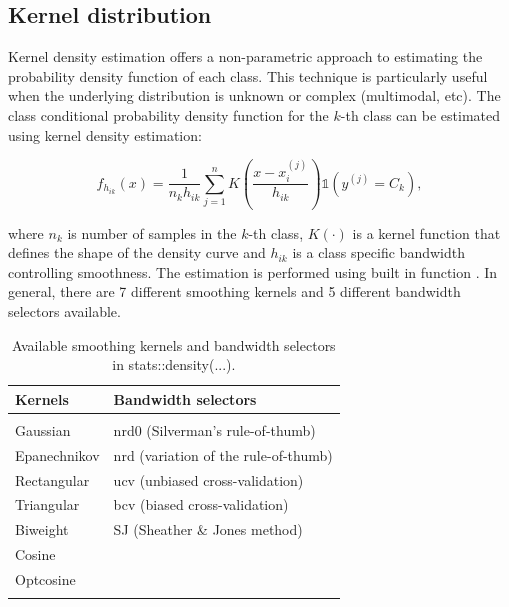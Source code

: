 \documentclass{article}\usepackage[]{graphicx}\usepackage[]{xcolor}
\begin{document}
\subsection{Kernel distribution}

Kernel density estimation offers a non-parametric approach to estimating the probability density function of each class. This technique is particularly useful when the underlying distribution is unknown or complex (multimodal, etc). The class conditional probability density function for the $k$-th class can be estimated using kernel density estimation:

$$\hat{f}_{h_{ik}}(x) = \frac{1}{n_{k}h_{ik}}\sum_{j=1}^nK\left(\frac{x - x_i^{(j)}}{h_{ik}}\right)\mathbb{1}(y^{(j)} = C_k),$$

where $n_k$ is number of samples in the $k$-th class, $K(\cdot)$ is a kernel function that defines the shape of the density curve and $h_{ik}$ is a class specific bandwidth controlling smoothness. The estimation is performed using built in \textcolor{darkgreen}{{}} function \textcolor{darkgreen}{{}}. In general, there are 7 different smoothing kernels and 5 different bandwidth selectors available.

\begin{table}[!htbp] \centering
\caption{Available smoothing kernels and bandwidth selectors in stats::density(...).}
\begin{tabular}{ll}
\hline %
\textbf{Kernels} & \textbf{Bandwidth selectors}         \\ \hline \\[-1.8ex]
Gaussian                               & nrd0 (Silverman's rule-of-thumb)                  \\
Epanechnikov                           & nrd (variation of the rule-of-thumb)              \\
Rectangular                            & ucv (unbiased cross-validation)                   \\
Triangular                             & bcv (biased cross-validation)                     \\
Biweight                               & SJ (Sheather \& Jones method)                     \\
Cosine                                 &                                                   \\
Optcosine                              &                                                   \\
\hline \\[-1.8ex]
\end{tabular}%
\end{table}
\end{document}

